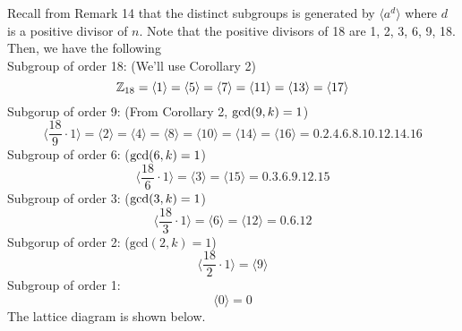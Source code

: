 \begin{solution}
    Recall from Remark 14 that the distinct subgroups is generated by $\langle a^d \rangle$ where $d$ is a positive divisor of $n$. Note that the positive divisors of 18 are 1, 2, 3, 6, 9, 18. Then, we have the following \\
    Subgroup of order 18: (We'll use Corollary 2)
    \[ \mathbb{Z}_{18} = \langle 1 \rangle = \langle 5 \rangle = \langle 7 \rangle = \langle 11 \rangle = \langle 13 \rangle = \langle 17 \rangle \]
    Subgorup of order 9: (From Corollary 2, $\text{gcd}\qty(9, k) = 1$)
    \[ \bigg\langle \frac{18}{9} \cdot 1 \bigg\rangle = \langle 2 \rangle = \langle 4 \rangle = \langle 8 \rangle = \langle 10 \rangle = \langle 14 \rangle = \langle 16 \rangle = \qty{0, 2, 4, 6, 8, 10, 12, 14, 16}\]
    Subgroup of order 6: ($\text{gcd}\qty(6, k) = 1$)
    \[ \bigg\langle \frac{18}{6} \cdot 1 \bigg\rangle  = \langle 3 \rangle = \langle 15 \rangle = \qty{0, 3, 6, 9, 12, 15}  \]
    Subgroup of order 3: ($\text{gcd}\qty(3, k) = 1$)
    \[ \bigg\langle \frac{18}{3} \cdot 1\bigg\rangle = \langle 6 \rangle = \langle 12 \rangle = \qty{0, 6, 12 }  \]
    Subgorup of order 2: ($\text{gcd}(2, k) = 1$)
    \[  \bigg\langle \frac{18}{2} \cdot 1 \bigg\rangle  = \langle 9\rangle \]
    Subgroup of order 1:
    \[ \langle 0 \rangle = \qty{0} \]
    The lattice diagram is shown below.
    
    \begin{center}
        
    \end{center}
\end{solution}

